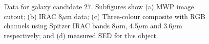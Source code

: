 \documentclass[times,usenatbib]{mn2e}
\begin{document}
\begin{figure}
\begin{center}
\caption{Data for galaxy candidate 27. Subfigures show (a) MWP image cutout; (b) IRAC 8$\mu$m data; (c) Three-colour composite with RGB channels using Spitzer IRAC bands 8$\mu$m, 4.5$\mu$m and 3.6$\mu$m respectively; and (d) measured SED for this object.}
\label{gal27}
\end{center}
\end{figure} 
\end{document}
